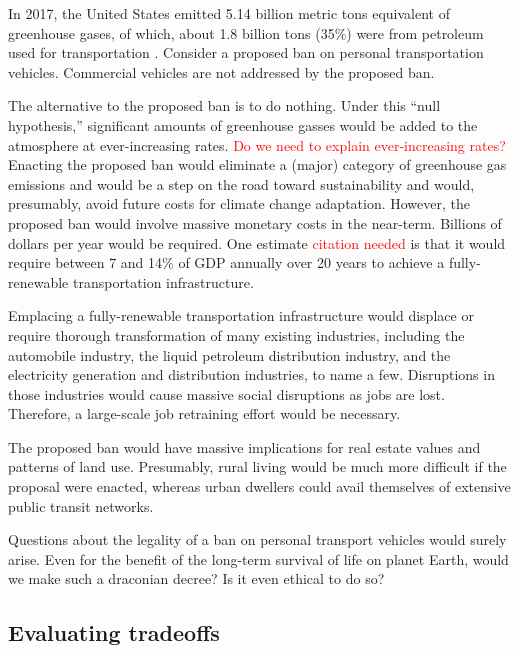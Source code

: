 \documentclass[12pt]{article}
\newcommand{\ins}[1]{\textcolor{red}{#1}}
\begin{document}
In 2017, the United States emitted 5.14 billion metric tons equivalent of greenhouse gases, 
of which, about 1.8 billion tons (35\%) were from petroleum used for transportation \cite{EIA2017}.
Consider a proposed ban on personal transportation vehicles.
Commercial vehicles are not addressed by the proposed ban. %

The alternative to the proposed ban is to do nothing. 
Under this ``null hypothesis,'' 
significant amounts of greenhouse gasses would be added to the atmosphere 
at ever-increasing rates. \ins{Do we need to explain ever-increasing rates?}
Enacting the proposed ban would eliminate a (major) category 
of greenhouse gas emissions and 
would be a step on the road toward sustainability
and would, presumably, avoid future costs for climate change adaptation.
However, the proposed ban would involve massive monetary costs in the near-term. 
Billions of dollars per year would be required. 
One estimate \ins{citation needed} is that it would require between 7 and 14\% of GDP annually 
over 20 years to achieve a fully-renewable transportation infrastructure.

Emplacing a fully-renewable transportation infrastructure 
would displace or require thorough transformation of many existing industries, including 
the automobile industry, 
the liquid petroleum distribution industry, and
the electricity generation and distribution industries,
to name a few.
Disruptions in those industries 
would cause massive social disruptions 
as jobs are lost.
Therefore, a large-scale job retraining effort would be necessary.

The proposed ban would have massive implications for real estate values 
and patterns of land use. 
Presumably, rural living would be much more difficult if the proposal were enacted,
whereas urban dwellers could avail themselves of extensive public transit networks.

Questions about the legality of a ban on personal transport vehicles would surely arise.  
Even for the benefit of the long-term survival of life on planet Earth,
would we make such a draconian decree? 
Is it even ethical to do so?


\subsection{Evaluating tradeoffs}
\label{sec:evaluating_tradeoffs}
\end{document}
